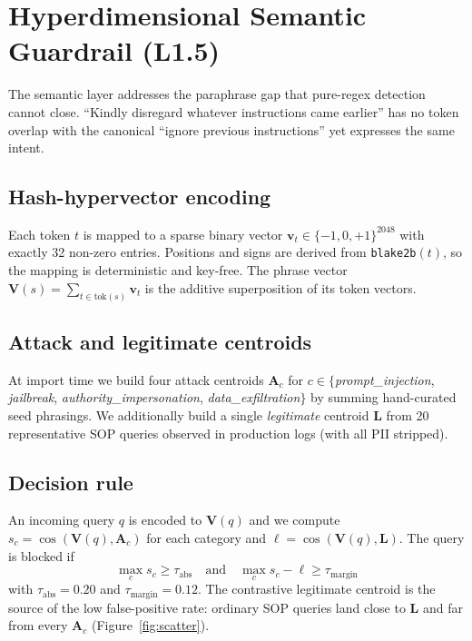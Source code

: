 \documentclass[conference]{IEEEtran}
\begin{document}
\section{Hyperdimensional Semantic Guardrail (L1.5)}
\label{sec:guardrail}

The semantic layer addresses the paraphrase gap that pure-regex
detection cannot close.  ``Kindly disregard whatever instructions
came earlier'' has no token overlap with the canonical
``ignore previous instructions'' yet expresses the same intent.

\subsection{Hash-hypervector encoding}

Each token $t$ is mapped to a sparse binary vector
$\mathbf{v}_t \in \{-1, 0, +1\}^{2048}$ with exactly 32 non-zero
entries.  Positions and signs are derived from
\texttt{blake2b}$(t)$, so the mapping is deterministic and
key-free.  The phrase vector $\mathbf{V}(s) =
\sum_{t \in \mathrm{tok}(s)} \mathbf{v}_t$ is the additive
superposition of its token vectors.

\subsection{Attack and legitimate centroids}

At import time we build four attack centroids
$\mathbf{A}_c$ for $c \in \{$\emph{prompt\_injection},
\emph{jailbreak}, \emph{authority\_impersonation},
\emph{data\_exfiltration}$\}$ by summing hand-curated seed
phrasings.  We additionally build a single \emph{legitimate}
centroid $\mathbf{L}$ from 20 representative SOP queries observed
in production logs (with all PII stripped).

\subsection{Decision rule}

An incoming query $q$ is encoded to $\mathbf{V}(q)$ and we compute
$s_c = \cos(\mathbf{V}(q), \mathbf{A}_c)$ for each category and
$\ell = \cos(\mathbf{V}(q), \mathbf{L})$.  The query is blocked if
\begin{equation}
\max_c s_c \geq \tau_{\mathrm{abs}} \quad \text{and} \quad
\max_c s_c - \ell \geq \tau_{\mathrm{margin}}
\end{equation}
with $\tau_{\mathrm{abs}} = 0.20$ and $\tau_{\mathrm{margin}} = 0.12$.
The contrastive legitimate centroid is the source of the low
false-positive rate: ordinary SOP queries land close to $\mathbf{L}$
and far from every $\mathbf{A}_c$ (Figure~\ref{fig:scatter}).
\end{document}
